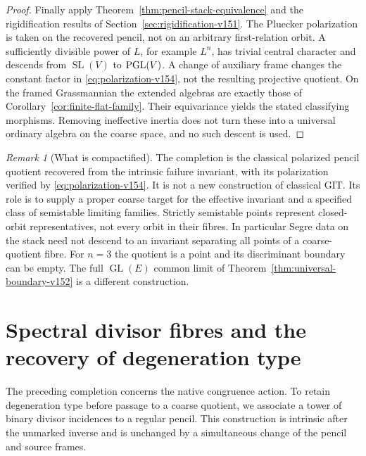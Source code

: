 \documentclass[11pt,reqno]{amsart}
\numberwithin{equation}{section}
\theoremstyle{definition}\newtheorem{definition}[theorem]{Definition}
\theoremstyle{remark}\newtheorem{remark}[theorem]{Remark}
\begin{document}
\begin{proof}
Finally apply Theorem~\ref{thm:pencil-stack-equivalence} and the
rigidification results of Section~\ref{sec:rigidification-v151}.
The Pluecker polarization is taken on the recovered pencil, not on
an arbitrary first-relation orbit. A sufficiently divisible power
of $L$, for example $L^n$, has trivial central character and descends
from $\operatorname{SL}(V)$ to $\operatorname{PGL}(V)$. A change of auxiliary frame
changes the constant factor in \eqref{eq:polarization-v154}, not the
resulting projective quotient. On the framed Grassmannian the extended
algebras are exactly those of Corollary~\ref{cor:finite-flat-family}.
Their equivariance yields the stated classifying morphisms. Removing
ineffective inertia does not turn these into a universal ordinary
algebra on the coarse space, and no such descent is used.
\end{proof}

\begin{remark}[What is compactified]\label{rem:git-scope-v154}
The completion is the classical polarized pencil quotient recovered
from the intrinsic failure invariant, with its polarization verified
by \eqref{eq:polarization-v154}. It is not a new construction of
classical GIT. Its role is to supply a proper coarse target for the
effective invariant and a specified class of semistable limiting
families. Strictly semistable points represent closed-orbit
representatives, not every orbit in their fibres. In particular Segre
data on the stack need not descend to an invariant separating all
points of a coarse-quotient fibre. For $n=3$ the quotient is a point
and its discriminant boundary can be empty. The full
$\operatorname{GL}(E)$ common limit of
Theorem~\ref{thm:universal-boundary-v152} is a different construction.
\end{remark}

\section{Spectral divisor fibres and the recovery of degeneration type}
\label{sec:spectral-divisor-v154}
The preceding completion concerns the native congruence action. To
retain degeneration type before passage to a coarse quotient, we
associate a tower of binary divisor incidences to a regular pencil.
This construction is intrinsic after the unmarked inverse and is
unchanged by a simultaneous change of the pencil and source frames.
\end{document}

